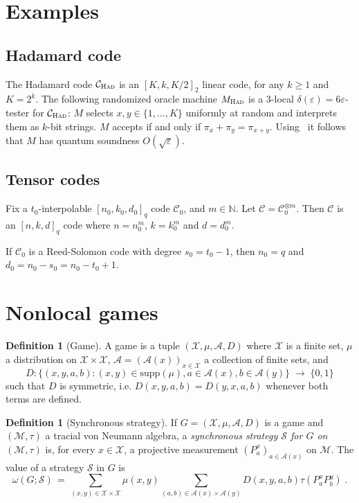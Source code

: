 \documentclass[11pt]{article}
\theoremstyle{definition}
\newtheorem{definition}[theorem]{Definition}
\newcommand{\code}{\mathcal{C}}
\newcommand{\strategy}{\mathscr{S}}
\newcommand{\N}{\ensuremath{\mathbb{N}}}
\newcommand{\mA}{\ensuremath{\mathcal{A}}}
\newcommand{\mM}{\ensuremath{\mathcal{M}}}
\newcommand{\mX}{\ensuremath{\mathcal{X}}}
\newcommand{\had}{\textsc{Had}}
\newcommand{\eps}{\varepsilon}
\begin{document}
		
		
\section{Examples}

\subsection{Hadamard code}

The Hadamard code $\code_\had$ is an $[K,k,K/2]_2$ linear code, for any $k\geq 1$ and $K=2^k$. The following randomized oracle machine $M_\had$ is a $3$-local $\delta(\eps)=6\eps$-tester for $\code_\had$: $M$ selects $x,y\in\{1,\ldots,K\}$ uniformly at random and interprets them as $k$-bit strings. $M$ accepts if and only if $\pi_x + \pi_y  = \pi_{x+y}$. Using~\cite[Theorem 10]{natarajan2016robust} it follows that $M$ has quantum soundness $O(\sqrt{\eps})$. 

\subsection{Tensor codes}

Fix a $t_0$-interpolable $[n_0,k_0,d_0]_q$ code $\code_0$, and $m\in \N$. Let $\code = \code_0^{\otimes m}$. Then $\code$ is an $[n,k,d]_q$ code where $n=n_0^m$, $k=k_0^m$ and $d=d_0^m$. 


If $\code_0$ is a Reed-Solomon code with degree $s_0=t_0-1$, then $n_0=q$ and $d_0=n_0-s_0=n_0-t_0+1$.


\section{Nonlocal games}



\begin{definition}[Game]
A game is a tuple $(\mX,\mu,\mA,D)$ where $\mX$ is a finite set, $\mu$ a distribution on $\mX\times \mX$, $\mA=(\mA(x))_{x\in\mX}$ a collection of finite sets, and 
\[ D: \big\{ (x,y,a,b) : (x,y)\in\text{supp}(\mu),a\in\mA(x),b\in\mA(y)\big\} \;\to\;\{0,1\}\]
such that $D$ is symmetric, i.e. $D(x,y,a,b)=D(y,x,a,b)$ whenever both terms are defined. 
\end{definition}
		
\begin{definition}[Synchronous strategy]
If $G=(\mX,\mu,\mA,D)$ is a game and $(\mM,\tau)$ a tracial von Neumann algebra, a \emph{synchronous strategy $\strategy$ for $G$ on $(\mM,\tau)$} is, for every $x\in \mX$, a projective measurement $(P^x_a)_{a\in \mA(x)}$ on $\mM$. The value of a strategy $\strategy$ in $G$ is 
\[ \omega(G;\strategy)\,=\, \sum_{(x,y)\in\mX\times\mX}\mu(x,y) \sum_{(a,b)\in\mA(x)\times\mA(y)} D(x,y,a,b) \tau(P^x_a P^y_b) \;.\]
\end{definition}
\end{document}
